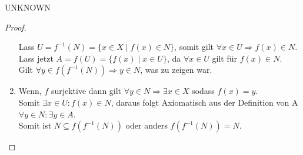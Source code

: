 \documentclass{problemset}
\begin{document}
\begin{problem}{UNKNOWN}
\begin{proof}
\begin{enumerate}[label=\roman*)]
              Lass $U = f^{-1}(N) = \{x \in X \mid f(x) \in N\}$, somit gilt $\forall x \in U \Rightarrow f(x) \in N$. \\
              Lass jetzt $A = f(U) = \{f(x) \mid x \in U\}$, da $\forall x \in U$ gilt für $f(x) \in N$. \\
              Gilt $\forall y \in f(f^{-1}(N)) \Rightarrow y \in N$, was zu zeigen war. \checkmark
        \item
              Wenn, $f$ surjektive dann gilt $\forall y \in N \Rightarrow \exists x \in X$ sodass $f(x) = y$. \\
              Somit $\exists x \in U: f(x) \in N$, daraus folgt Axiomatisch aus der Definition von A $\forall y \in N: \exists y \in A$.  \\
              Somit ist $N \subseteq f(f^{-1}(N))$ oder anders $f(f^{-1}(N)) = N$. \checkmark
    \end{enumerate}
\end{proof}
\end{problem}
\end{document}
